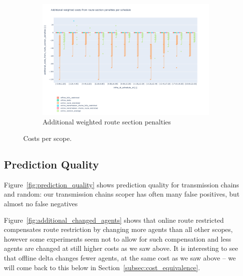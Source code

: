 \documentclass{article}
\begin{document}
\begin{figure}[hbtp]
\begin{subfigure}{\textwidth}
            \includegraphics[width=\textwidth]{Figures/04_computational_results/additional_route_section_penalties.pdf}
            \caption{Additional weighted route section penalties}
             \label{fig:additional_route_section_penalties}
        \end{subfigure}
	\caption{Costs per scope.}
	\label{fig:delay}
\end{figure}


\subsection{Prediction Quality}

Figure~\ref{fig:prediction_quality} shows prediction quality for transmission chains and random: our transmission chains scoper has often many false positives, but almost no false negatives

Figure~\ref{fig:additional_changed_agents} shows that online route restricted compensates route restriction by changing more agents than all other scopes, however some experiments seem not to allow for such compensation and less agents are changed at still higher costs as we saw above. It is interesting to see that offline delta changes fewer agents, at the same cost as we saw above -- we will come back to this below in Section~\ref{subsec:cost_equivalence}.
\end{document}
